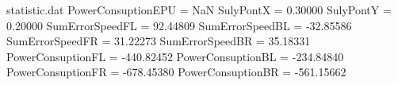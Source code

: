 \begin{filecontents*}{statistic.dat}
PowerConsuptionEPU =        NaN
SulyPontX =    0.30000
SulyPontY =    0.20000
SumErrorSpeedFL =   92.44809
SumErrorSpeedBL =  -32.85586
SumErrorSpeedFR =   31.22273
SumErrorSpeedBR =   35.18331
PowerConsuptionFL = -440.82452
PowerConsuptionBL = -234.84840
PowerConsuptionFR = -678.45380
PowerConsuptionBR = -561.15662
\end{filecontents*}
